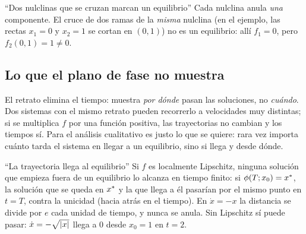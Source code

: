 
\begin{trampa}[label=tr:bi-nulclinas]{``Dos nulclinas que se cruzan marcan un equilibrio''}
Cada nulclina anula \emph{una} componente. El cruce de dos ramas de la \emph{misma} nulclina (en el ejemplo, las rectas $x_1=0$ y $x_2=1$ se cortan en $(0,1)$) no es un equilibrio: allí $f_1=0$, pero $f_2(0,1)=1\neq0$.
\end{trampa}

\subsection{Lo que el plano de fase no muestra}

El retrato elimina el tiempo: muestra \emph{por dónde} pasan las soluciones, no \emph{cuándo}. Dos sistemas con el mismo retrato pueden recorrerlo a velocidades muy distintas; si se multiplica $f$ por una función positiva, las trayectorias no cambian y los tiempos sí. Para el análisis cualitativo es justo lo que se quiere: rara vez importa cuánto tarda el sistema en llegar a un equilibrio, sino si llega y desde dónde.

\begin{trampa}[label=tr:bi-llega]{``La trayectoria llega al equilibrio''}
Si $f$ es localmente Lipschitz, ninguna solución que empieza fuera de un equilibrio lo alcanza en tiempo finito: si $\phi(T;x_0)=x^{*}$, la solución que se queda en $x^{*}$ y la que llega a él pasarían por el mismo punto en $t=T$, contra la unicidad (hacia atrás en el tiempo). En $\dot x=-x$ la distancia se divide por $e$ cada unidad de tiempo, y nunca se anula. Sin Lipschitz sí puede pasar: $\dot x=-\sqrt{\left\lvert x\right\rvert}$ llega a $0$ desde $x_0=1$ en $t=2$.
\end{trampa}

